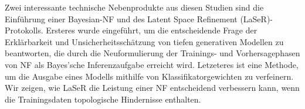 Zwei interessante technische Nebenprodukte aus diesen Studien sind die Einführung einer Bayesian-NF und des Latent Space Refinement (LaSeR)-Protokolls. Ersteres wurde eingeführt, um die entscheidende Frage der Erklärbarkeit und Unsicherheitsschätzung von tiefen generativen Modellen zu beantworten, die durch die Neuformulierung der Trainings- und Vorhersagephasen von NF als Bayes'sche Inferenzaufgabe erreicht wird. Letzeteres ist eine Methode, um die Ausgabe eines Modells mithilfe von Klassifikatorgewichten zu verfeinern. Wir zeigen, wie LaSeR die Leistung einer NF entscheidend verbessern kann, wenn die Trainingsdaten topologische Hindernisse enthalten.

%
